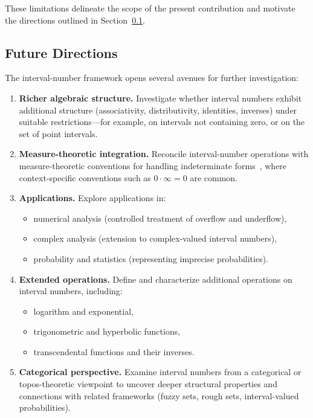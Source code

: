 \documentclass[11pt,a4paper]{article}
\theoremstyle{paperdef}
\begin{document}
These limitations delineate the scope of the present contribution and
motivate the directions outlined in Section~\ref{sec:future}.

\subsection{Future Directions}\label{sec:future}

The interval-number framework opens several avenues for further
investigation:
\begin{enumerate}[leftmargin=2em]
  \item \textbf{Richer algebraic structure.} Investigate whether
    interval numbers exhibit additional structure (associativity,
    distributivity, identities, inverses) under suitable
    restrictions---for example, on intervals not containing zero, or
    on the set of point intervals.

  \item \textbf{Measure-theoretic integration.} Reconcile
    interval-number operations with measure-theoretic conventions for
    handling indeterminate forms~\cite{Folland1999}, where
    context-specific conventions such as $0 \cdot \infty = 0$ are
    common.

  \item \textbf{Applications.} Explore applications in:
    \begin{itemize}[leftmargin=2em]
      \item numerical analysis (controlled treatment of overflow and
        underflow),
      \item complex analysis (extension to complex-valued interval
        numbers),
      \item probability and statistics (representing imprecise
        probabilities).
    \end{itemize}

  \item \textbf{Extended operations.} Define and characterize
    additional operations on interval numbers, including:
    \begin{itemize}[leftmargin=2em]
      \item logarithm and exponential,
      \item trigonometric and hyperbolic functions,
      \item transcendental functions and their inverses.
    \end{itemize}

  \item \textbf{Categorical perspective.} Examine interval numbers
    from a categorical or topos-theoretic viewpoint to uncover deeper
    structural properties and connections with related frameworks
    (fuzzy sets, rough sets, interval-valued probabilities).


\end{enumerate}
\end{document}
